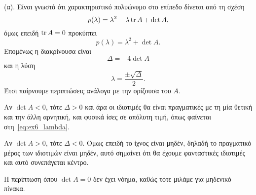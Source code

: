 \begin{solution}
    (α). Είναι γνωστό ότι χαρακτηριστικό πολυώνυμο στο επίπεδο δίνεται από τη
    σχέση
    \[
        p(\lambda) = \lambda^2 - \lambda\operatorname{tr}{A}+ \det{A},
    \]
    όμως επειδή \( \operatorname{tr}{A} = 0 \) προκύπτει
    \[
        p(\lambda) = \lambda^2 + \det{A}.
    \]
    Επομένως η διακρίνουσα είναι
    \[
        \Delta = -4\det{A}
    \]
    και η λύση
    \begin{equation}\label{eq:ex6_lambda}
        \lambda = \frac{\pm \sqrt{\Delta}}{2}.
    \end{equation}
    Έτσι παίρνουμε περιπτώσεις ανάλογα με την ορίζουσα του \( A \).

    Αν \( \det{A} < 0 \), τότε \( \Delta > 0 \) και άρα οι ιδιοτιμές θα είναι
    πραγματικές με τη μία θετική και την άλλη αρνητική, και φυσικά ίσες σε
    απόλυτη τιμή, όπως φαίνεται στη~\eqref{eq:ex6_lambda}.

    Αν \( \det{A} > 0 \), τότε \( \Delta < 0 \). Όμως επειδή το ίχνος είναι
    μηδέν, δηλαδή το πραγματικό μέρος των ιδιοτιμών είναι μηδέν, αυτό σημαίνει
    ότι θα έχουμε φανταστικές ιδιοτιμές και αυτό συνεπάγεται κέντρο.

    Η περίπτωση όπου \( \det{A} = 0\) δεν έχει νόημα, καθώς τότε μιλάμε για
    μηδενικό πίνακα.


\end{solution}
